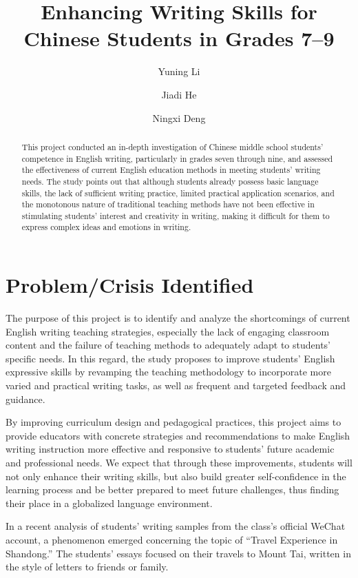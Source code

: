 \documentclass[11pt]{article}
\title{Enhancing Writing Skills for Chinese Students in Grades 7--9}
\author{Yuning Li}
\author{Jiadi He}
\author{Ningxi Deng}
\begin{document}
\maketitle

\begin{abstract}
This project conducted an in-depth investigation of Chinese middle school students' competence in English writing, particularly in grades seven through nine, and assessed the effectiveness of current English education methods in meeting students' writing needs. The study points out that although students already possess basic language skills, the lack of sufficient writing practice, limited practical application scenarios, and the monotonous nature of traditional teaching methods have not been effective in stimulating students' interest and creativity in writing, making it difficult for them to express complex ideas and emotions in writing.
\end{abstract}

\section{Problem/Crisis Identified}

The purpose of this project is to identify and analyze the shortcomings of current English writing teaching strategies, especially the lack of engaging classroom content and the failure of teaching methods to adequately adapt to students' specific needs. In this regard, the study proposes to improve students' English expressive skills by revamping the teaching methodology to incorporate more varied and practical writing tasks, as well as frequent and targeted feedback and guidance.

By improving curriculum design and pedagogical practices, this project aims to provide educators with concrete strategies and recommendations to make English writing instruction more effective and responsive to students' future academic and professional needs. We expect that through these improvements, students will not only enhance their writing skills, but also build greater self-confidence in the learning process and be better prepared to meet future challenges, thus finding their place in a globalized language environment.

In a recent analysis of students' writing samples from the class's official WeChat account, a phenomenon emerged concerning the topic of ``Travel Experience in Shandong.'' The students' essays focused on their travels to Mount Tai, written in the style of letters to friends or family.
\end{document}
